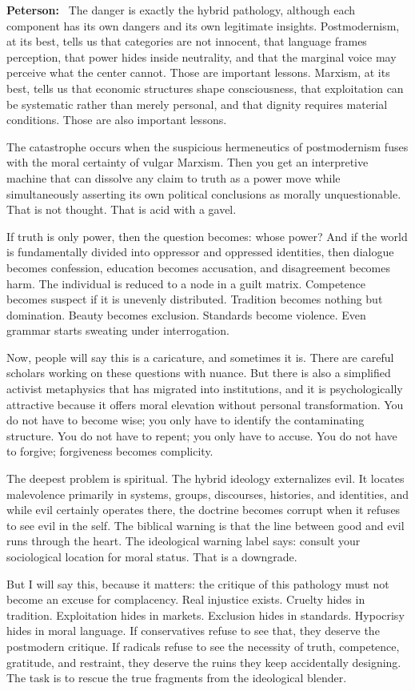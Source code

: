 \documentclass[a4paper,11pt]{article}
\newenvironment{answer}{\par\noindent\color{black}\textbf{Peterson:}\ }{\par}
\begin{document}
\begin{answer}
The danger is exactly the hybrid pathology, although each component has its own dangers and its own legitimate insights. Postmodernism, at its best, tells us that categories are not innocent, that language frames perception, that power hides inside neutrality, and that the marginal voice may perceive what the center cannot. Those are important lessons. Marxism, at its best, tells us that economic structures shape consciousness, that exploitation can be systematic rather than merely personal, and that dignity requires material conditions. Those are also important lessons.

The catastrophe occurs when the suspicious hermeneutics of postmodernism fuses with the moral certainty of vulgar Marxism. Then you get an interpretive machine that can dissolve any claim to truth as a power move while simultaneously asserting its own political conclusions as morally unquestionable. That is not thought. That is acid with a gavel.

If truth is only power, then the question becomes: whose power? And if the world is fundamentally divided into oppressor and oppressed identities, then dialogue becomes confession, education becomes accusation, and disagreement becomes harm. The individual is reduced to a node in a guilt matrix. Competence becomes suspect if it is unevenly distributed. Tradition becomes nothing but domination. Beauty becomes exclusion. Standards become violence. Even grammar starts sweating under interrogation.

Now, people will say this is a caricature, and sometimes it is. There are careful scholars working on these questions with nuance. But there is also a simplified activist metaphysics that has migrated into institutions, and it is psychologically attractive because it offers moral elevation without personal transformation. You do not have to become wise; you only have to identify the contaminating structure. You do not have to repent; you only have to accuse. You do not have to forgive; forgiveness becomes complicity.

The deepest problem is spiritual. The hybrid ideology externalizes evil. It locates malevolence primarily in systems, groups, discourses, histories, and identities, and while evil certainly operates there, the doctrine becomes corrupt when it refuses to see evil in the self. The biblical warning is that the line between good and evil runs through the heart. The ideological warning label says: consult your sociological location for moral status. That is a downgrade.

But I will say this, because it matters: the critique of this pathology must not become an excuse for complacency. Real injustice exists. Cruelty hides in tradition. Exploitation hides in markets. Exclusion hides in standards. Hypocrisy hides in moral language. If conservatives refuse to see that, they deserve the postmodern critique. If radicals refuse to see the necessity of truth, competence, gratitude, and restraint, they deserve the ruins they keep accidentally designing. The task is to rescue the true fragments from the ideological blender.
\end{answer}
\end{document}
